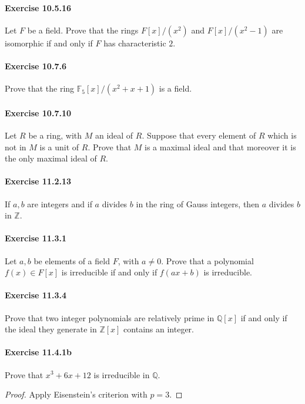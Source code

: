 \documentclass{article}
\begin{document}
\paragraph{Exercise 10.5.16} Let $F$ be a field. Prove that the rings $F[x] /\left(x^2\right)$ and $F[x] /\left(x^2-1\right)$ are isomorphic if and only if $F$ has characteristic $2 .$


\paragraph{Exercise 10.7.6} Prove that the ring $\mathbb{F}_5[x] /\left(x^2+x+1\right)$ is a field.


\paragraph{Exercise 10.7.10} Let $R$ be a ring, with $M$ an ideal of $R$. Suppose that every element of $R$ which is not in $M$ is a unit of $R$. Prove that $M$ is a maximal ideal and that moreover it is the only maximal ideal of $R$.


\paragraph{Exercise 11.2.13} If $a, b$ are integers and if $a$ divides $b$ in the ring of Gauss integers, then $a$ divides $b$ in $\mathbb{Z}$.


\paragraph{Exercise 11.3.1} Let $a, b$ be elements of a field $F$, with $a \neq 0$. Prove that a polynomial $f(x) \in F[x]$ is irreducible if and only if $f(a x+b)$ is irreducible.


\paragraph{Exercise 11.3.4} Prove that two integer polynomials are relatively prime in $\mathbb{Q}[x]$ if and only if the ideal they generate in $\mathbb{Z}[x]$ contains an integer.


\paragraph{Exercise 11.4.1b} Prove that $x^3 + 6x + 12$ is irreducible in $\mathbb{Q}$.
\begin{proof}
    Apply Eisenstein's criterion with $p=3$. 
\end{proof}
\end{document}
